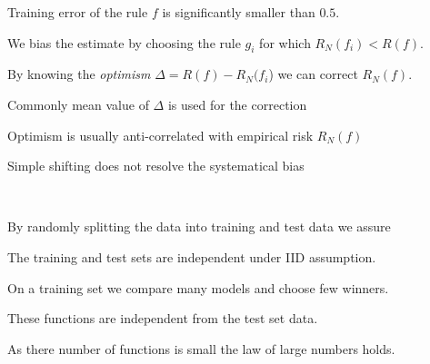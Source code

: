 \documentclass[landscape,footrule]{foils}
\begin{document}

\vspace*{-0.5cm}

Training error of the rule $f$ is significantly smaller than $0.5$.
\begin{triangles}
\item We bias the estimate by choosing the rule $g_i$ for which $R_N(f_i) < R(f)$.
\end{triangles}


\vspace*{-0.5cm}
By knowing the \emph{optimism} $\Delta=R(f)-R_N(f_i$) we can correct $R_N(f)$.   
\begin{triangles}
\item Commonly mean value of $\Delta$ is used for the correction 
\end{triangles}



\vspace*{-0.5cm}
Optimism is usually anti-correlated with empirical risk $R_N(f)$   
\begin{triangles}
\item Simple shifting does not resolve the systematical bias  
\end{triangles}




\

By randomly splitting the data into training and test data we assure
\begin{triangles}
\item The training and test sets are independent under IID assumption.
\item On a training set we compare many models and  choose few winners. 
\item These functions are independent from the test set data.
\item As there number of functions is small the law of large numbers holds. 
\end{triangles}



\end{document}
